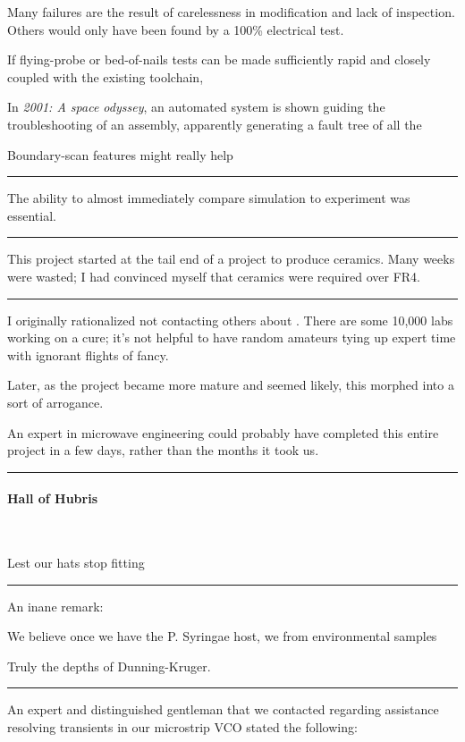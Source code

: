 \documentclass[paper.tex]{subfiles}
\begin{document}
Many failures are the result of carelessness in modification and lack of inspection. Others would only have been found by a 100\% electrical test.

If flying-probe or bed-of-nails tests can be made sufficiently rapid and closely coupled with the existing toolchain, 

In {\it 2001: A space odyssey}, an automated system is shown guiding the troubleshooting of an assembly, apparently generating a fault tree of all the 

Boundary-scan features might really help 

\rule{\linewidth}{0.2pt}

The ability to almost immediately compare simulation to experiment was essential.

\rule{\linewidth}{0.2pt}

This project started at the tail end of a project to produce ceramics. Many weeks were wasted; I had convinced myself that ceramics were required over FR4. 

\rule{\linewidth}{0.2pt}

I originally rationalized not contacting others about . There are some 10,000 labs working on a cure; it's not helpful to have random amateurs tying up expert time with ignorant flights of fancy. 

Later, as the project became more mature and seemed likely, this morphed into a sort of arrogance.

An expert in microwave engineering could probably have completed this entire project in a few days, rather than the months it took us.

\rule{\linewidth}{0.2pt}

\paragraph{Hall of Hubris} \

Lest our hats stop fitting

\rule{\linewidth}{0.2pt}

An inane remark:

\begin{displayquote}
We believe once we have the P. Syringae host, we from environmental samples
\end{displayquote}

Truly the depths of Dunning-Kruger.

\rule{\linewidth}{0.2pt}

An expert and distinguished gentleman that we contacted regarding assistance resolving transients in our microstrip VCO stated the following:
\end{document}
